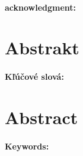 \documentclass[12pt, oneside]{book}
\begin{document}

\frontmatter

\setcounter{page}{3}
\newpage 
~

\vfill
{\bf acknowledgment:}


\newpage 
\section*{Abstrakt}

\paragraph*{Kľúčové slová:} %


\newpage 
\section*{Abstract}


\paragraph*{Keywords:} %


%



\newpage 

\tableofcontents


\end{document}
